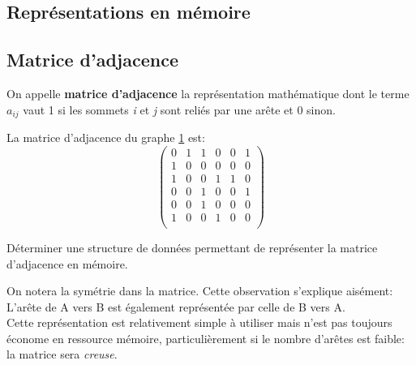 \documentclass[a4paper,11pt]{article}
\begin{document}
\begin{Form}
\section{Représentations en mémoire}
\subsection{Matrice d'adjacence}
On appelle \textbf{matrice d'adjacence} la représentation mathématique dont le terme $a_{ij}$ vaut 1 si les sommets \emph{i} et \emph{j} sont reliés par une arête et 0 sinon.

\begin{figure}[!h]
\centering
{}
\label{graphe0}
\end{figure}

La matrice d'adjacence du graphe \ref{graphe0} est:
$$\begin{pmatrix}
0 & 1 & 1 & 0 & 0 & 1 \\
1 & 0 & 0 & 0 & 0 & 0 \\
1 & 0 & 0 & 1 & 1 & 0 \\
0 & 0 & 1 & 0 & 0 & 1 \\
0 & 0 & 1 & 0 & 0 & 0 \\
1 & 0 & 0 & 1 & 0 & 0 \\
\end{pmatrix}$$
\begin{activite}
Déterminer une structure de données permettant de représenter la matrice d'adjacence en mémoire.
\end{activite}
On notera la symétrie dans la matrice. Cette observation s'explique aisément: L'arête de A vers B est également représentée par celle de B vers A.\\
Cette représentation est relativement simple à utiliser mais n'est pas toujours économe en ressource mémoire, particulièrement si le nombre d'arêtes est faible: la matrice sera \emph{creuse}.

\end{Form}
\end{document}
